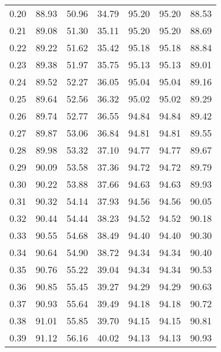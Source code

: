 \begin{tabular}{|c|c|c|c|c|c|c|}
      0.20 &     88.93 &     50.96 &      34.79 &   95.20 &      95.20 &         88.53 \\
      0.21 &     89.08 &     51.30 &      35.11 &   95.20 &      95.20 &         88.69 \\
      0.22 &     89.22 &     51.62 &      35.42 &   95.18 &      95.18 &         88.84 \\
      0.23 &     89.38 &     51.97 &      35.75 &   95.13 &      95.13 &         89.01 \\
      0.24 &     89.52 &     52.27 &      36.05 &   95.04 &      95.04 &         89.16 \\
      0.25 &     89.64 &     52.56 &      36.32 &   95.02 &      95.02 &         89.29 \\
      0.26 &     89.74 &     52.77 &      36.55 &   94.84 &      94.84 &         89.42 \\
      0.27 &     89.87 &     53.06 &      36.84 &   94.81 &      94.81 &         89.55 \\
      0.28 &     89.98 &     53.32 &      37.10 &   94.77 &      94.77 &         89.67 \\
      0.29 &     90.09 &     53.58 &      37.36 &   94.72 &      94.72 &         89.79 \\
      0.30 &     90.22 &     53.88 &      37.66 &   94.63 &      94.63 &         89.93 \\
      0.31 &     90.32 &     54.14 &      37.93 &   94.56 &      94.56 &         90.05 \\
      0.32 &     90.44 &     54.44 &      38.23 &   94.52 &      94.52 &         90.18 \\
      0.33 &     90.55 &     54.68 &      38.49 &   94.40 &      94.40 &         90.30 \\
      0.34 &     90.64 &     54.90 &      38.72 &   94.34 &      94.34 &         90.40 \\
      0.35 &     90.76 &     55.22 &      39.04 &   94.34 &      94.34 &         90.53 \\
      0.36 &     90.85 &     55.45 &      39.27 &   94.29 &      94.29 &         90.63 \\
      0.37 &     90.93 &     55.64 &      39.49 &   94.18 &      94.18 &         90.72 \\
      0.38 &     91.01 &     55.85 &      39.70 &   94.15 &      94.15 &         90.81 \\
      0.39 &     91.12 &     56.16 &      40.02 &   94.13 &      94.13 &         90.93 \\

\end{tabular}

